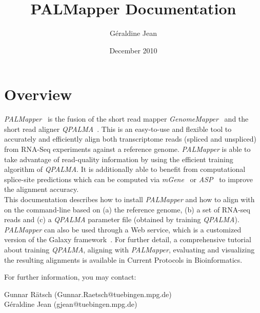 \documentclass{article}
\begin{document}
\newcommand{\PALMA}{{\sl PALMA}}
\newcommand{\PALMapper}{{\sl PALMapper}}
\newcommand{\GM}{{\sl GenomeMapper}}
\newcommand{\Galaxy}{{\sl Galaxy}}
\newcommand{\mGene}{{\sl mGene}}
\newcommand{\ASP}{{\sl ASP}}
\newcommand{\evaluationToolbox}{{\sl evaluationToolbox}}
\newcommand{\QP}{{\sl QPALMA}}
\newcommand{\QPA}{{\sl QPALMA alignment algorithm }}
\newcommand{\QPH}{{\sl QPALMA approximation }}
\newcommand{\QPP}{{\sl QPALMA pipeline }}
\newcommand{\qparam}[1]{{\bf #1}}



\setlength{\parindent}{0cm}


\title{PALMapper Documentation}
\author{G\'eraldine Jean}
\date{December 2010}

\maketitle
%
%
%

\section{Overview}
\label{sec:overview}

\PALMapper{}~\cite{Palmapper} is the fusion of the short read mapper
\GM{}~\cite{GenomeMapper} and the short read aligner
\QP{}~\cite{DeBona08}. This is an easy-to-use and flexible tool 
to accurately and efficiently align both transcriptome reads (spliced 
and unspliced) from RNA-Seq experiments against a reference
genome. \PALMapper{} is able to take advantage of read-quality 
information by using the efficient training algorithm of \QP{}. It is
additionally able to benefit from computational splice-site
predictions which can be computed via
\mGene{}~\cite{Schweikertetal09,Schweikertetal09b} or
\ASP{}~\cite{Sonnenburgetal07} to improve the alignment accuracy.\\ 
This documentation describes how to install \PALMapper{} and how to
align with on the command-line based on (a) the reference genome, (b) a 
set of RNA-seq reads and (c) a \QP{} parameter file (obtained by
training \QP{}). \PALMapper{} can also be used through a Web service,
which is a customized version of the Galaxy
framework~\cite{Galaxy1,Galaxy2,Galaxy3}. For further detail, a
comprehensive tutorial~\cite{Palmapper} about 
training \QP{}, aligning with \PALMapper{}, evaluating and visualizing
the resulting alignments is available in Current Protocols in
Bioinformatics. 

For further information, you may contact:
\begin{center}
Gunnar R\"atsch (Gunnar.Raetsch@tuebingen.mpg.de)\\
G\'eraldine Jean (gjean@tuebingen.mpg.de)
\end{center}
\end{document}
